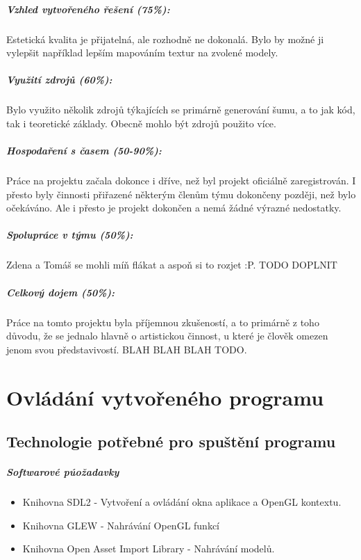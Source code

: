 \documentclass[12pt,a4paper,titlepage,final]{report}
\begin{document}
\paragraph{Vzhled vytvořeného řešení (75\%):} Estetická kvalita je přijatelná, ale rozhodně ne dokonalá. Bylo by možné ji vylepšit například lepším mapováním textur na zvolené modely.

\paragraph{Využití zdrojů (60\%):} Bylo využito několik zdrojů týkajících se primárně generování šumu, a to jak kód, tak i teoretické základy. Obecně mohlo být zdrojů použito více.

\paragraph{Hospodaření s časem (50-90\%):} Práce na projektu začala dokonce i dříve, než byl projekt oficiálně zaregistrován. I přesto byly činnosti přiřazené některým členům týmu dokončeny později, než bylo očekáváno. Ale i přesto je projekt dokončen a nemá žádné výrazné nedostatky.

\paragraph{Spolupráce v týmu (50\%):} Zdena a Tomáš se mohli míň flákat a aspoň si to rozjet :P. TODO DOPLNIT

\paragraph{Celkový dojem (50\%):} Práce na tomto projektu byla příjemnou zkušeností, a to primárně z toho důvodu, že se jednalo hlavně o artistickou činnost, u které je člověk omezen jenom svou představivostí. BLAH BLAH BLAH TODO.

\chapter{Ovládání vytvořeného programu}

\section{Technologie potřebné pro spuštění programu}
\paragraph{Softwarové púožadavky}
\begin{itemize}
	\item Knihovna SDL2 - Vytvoření a ovládání okna aplikace a OpenGL kontextu.
	\item Knihovna GLEW - Nahrávání OpenGL funkcí
	\item Knihovna Open Asset Import Library - Nahrávání modelů.
\end{itemize}
\end{document}
